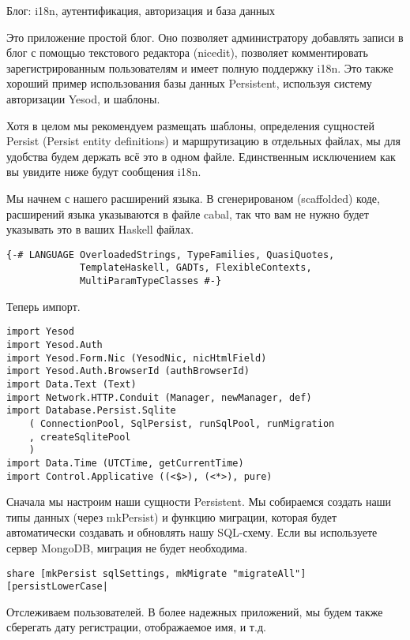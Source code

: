 Блог: i18n, аутентификация, авторизация и база данных

Это приложение простой блог. Оно позволяет администратору добавлять записи в блог с помощью текстового редактора (nicedit), позволяет комментировать зарегистрированным пользователям и имеет полную поддержку i18n. Это также хороший пример использования базы данных Persistent, используя систему авторизации Yesod, и шаблоны.

Хотя в целом мы рекомендуем размещать шаблоны, определения сущностей Persist (Persist entity definitions) и маршрутизацию в отдельных файлах, мы для удобства будем держать всё это в одном файле. Единственным исключением как вы увидите ниже будут сообщения i18n.

Мы начнем с нашего расширений языка. В сгенерированом (scaffolded) коде, расширений языка указываются в файле cabal, так что вам не нужно будет указывать это в ваших Haskell файлах.
 
\begin{lstlisting}
{-# LANGUAGE OverloadedStrings, TypeFamilies, QuasiQuotes,
             TemplateHaskell, GADTs, FlexibleContexts,
             MultiParamTypeClasses #-}
\end{lstlisting}
 
Теперь импорт. 

\begin{lstlisting} 
import Yesod
import Yesod.Auth
import Yesod.Form.Nic (YesodNic, nicHtmlField)
import Yesod.Auth.BrowserId (authBrowserId)
import Data.Text (Text)
import Network.HTTP.Conduit (Manager, newManager, def)
import Database.Persist.Sqlite
    ( ConnectionPool, SqlPersist, runSqlPool, runMigration
    , createSqlitePool
    )
import Data.Time (UTCTime, getCurrentTime)
import Control.Applicative ((<$>), (<*>), pure)
\end{lstlisting}

Сначала мы настроим наши сущности Persistent. Мы собираемся создать наши типы данных (через mkPersist) и функцию миграции, которая будет автоматически создавать и обновлять нашу SQL-схему. Если вы используете сервер MongoDB, миграция не будет необходима.

\begin{lstlisting}
share [mkPersist sqlSettings, mkMigrate "migrateAll"] [persistLowerCase|
\end{lstlisting}
 
Отслеживаем пользователей. В более надежных приложений, мы будем также сберегать дату регистрации, отображаемое имя, и т.д.
 
